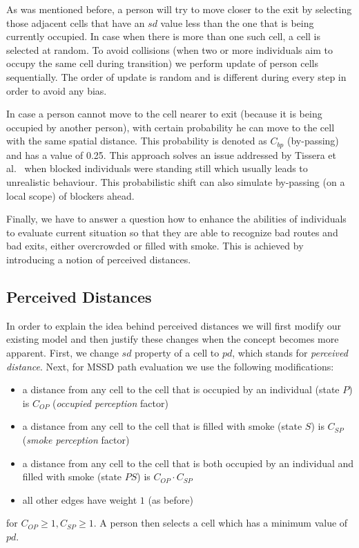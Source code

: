 As was mentioned before, a person will try to move closer to the exit by
selecting those adjacent cells that have an $sd$ value less than the one that
is being currently occupied.
In case when there is more than one such cell, a cell is selected at random.
To avoid collisions (when two or more individuals aim to occupy the same cell
during transition) we perform update of person cells sequentially.
The order of update is random and is different during every step in order to
avoid any bias.

In case a person cannot move to the cell nearer to exit (because it is being 
occupied by another person), with certain probability he can move to the
cell with the same spatial distance.
This probability is denoted as $C_{bp}$ (by-passing) and has a value
of 0.25.
This approach solves an issue addressed by Tissera et al.~\cite{Tissera1} when 
blocked individuals were standing still which usually leads to unrealistic 
behaviour.
This probabilistic shift can also simulate by-passing (on a local scope) of
blockers ahead.

Finally, we have to answer a question how to enhance the abilities of
individuals to evaluate current situation so that they are able to recognize bad
routes and bad exits, either overcrowded or filled with smoke.
This is achieved by introducing a notion of perceived distances.

\subsection{Perceived Distances}
In order to explain the idea behind perceived distances we will first modify our 
existing model and then justify these changes when the concept becomes more
apparent. 
First, we change $sd$ property of a cell to $pd$, which stands for
\emph{perceived distance}.
Next, for MSSD path evaluation we use the following modifications:

\begin{itemize}
    \item a distance from any cell to the cell that is occupied by an
    individual (state $P$) is $C_{OP}$ (\emph{occupied perception} factor)
    \item a distance from any cell to the cell that is filled with smoke
    (state $S$) is $C_{SP}$ (\emph{smoke perception} factor)
    \item a distance from any cell to the cell that is both occupied by an
    individual and filled with smoke (state $PS$) is $C_{OP} \cdot C_{SP}$
    \item all other edges have weight $1$ (as before)
\end{itemize}
for $C_{OP} \geq 1, C_{SP} \geq 1$.
A person then selects a cell which has a minimum value of $pd$.

